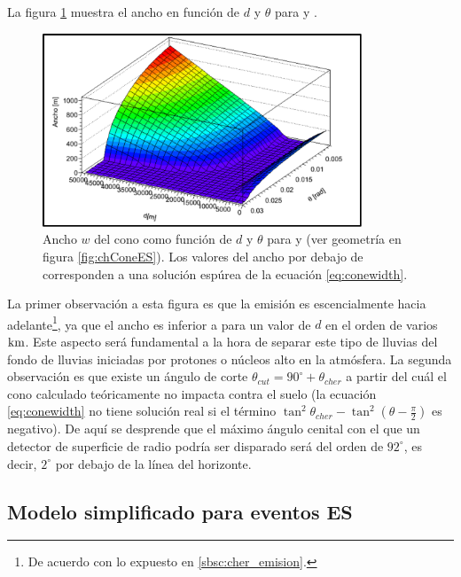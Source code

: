 	La figura \ref{fig:chConeWidth} muestra el ancho en función de $d$ y $\theta$ para  y .
	\begin{figure}[ht!]
	\centering
		\includegraphics[width=0.85\textwidth]{fig/EASRadio/anchoLluvia}
		\caption{\label{fig:chConeWidth} Ancho $w$ del cono \cher{} como función de $d$ y $\theta$ para  y  (ver geometr\'ia en figura \ref{fig:chConeES}). Los valores del ancho por debajo de  corresponden a una solución espúrea de la ecuación \ref{eq:conewidth}.}
	\end{figure}
	La primer observación a esta figura es que la emisión es escencialmente hacia adelante\footnote{De acuerdo con lo expuesto en \ref{sbsc:cher_emision}.}, ya que el ancho es inferior a  para un valor de $d$ en el orden de varios $\rm km$.
	Este aspecto será fundamental a la hora de separar este tipo de lluvias del fondo de lluvias iniciadas por protones o núcleos alto en la atmósfera.
	La segunda observación es que existe un ángulo de corte $\theta_{cut}=90^\circ+\theta_{cher}$ a partir del cuál el cono \cher{} calculado teóricamente no impacta contra el suelo (la ecuación \ref{eq:conewidth} no tiene solución real si el término $\tan^2 \theta_{cher}-\tan^2 (\theta-\frac{\pi}{2})$ es negativo).
	De aquí se desprende que el máximo ángulo cenital con el que un detector de superficie de radio podría ser disparado será del orden de $92^\circ$, es decir, $2^\circ$ por debajo de la l\'inea del horizonte.
	
	\subsection{Modelo simplificado para eventos ES}
	\label{sc:toymodelES}


